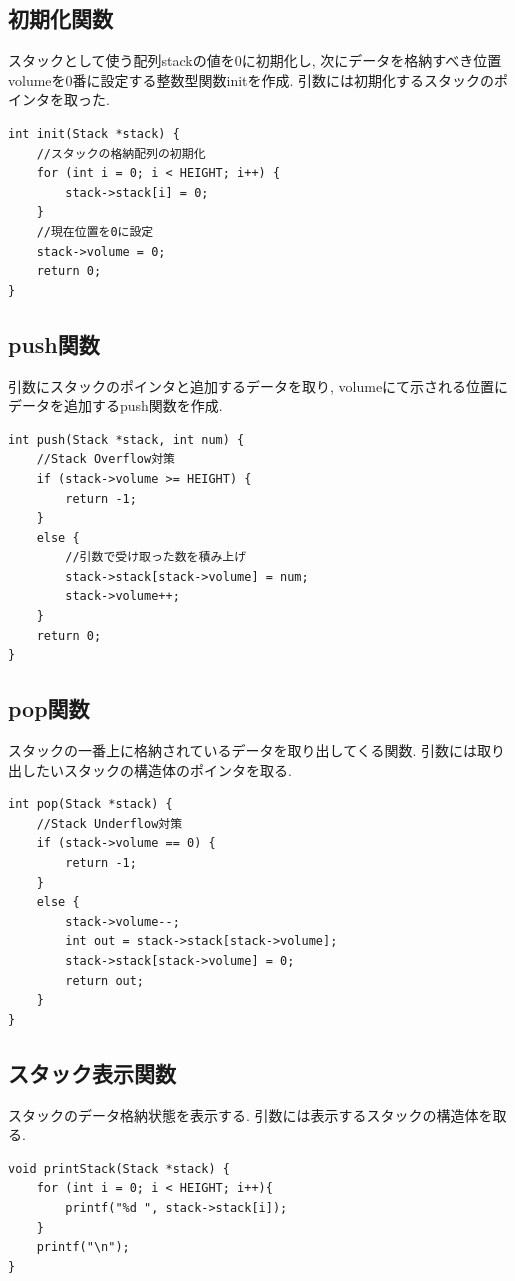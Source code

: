 \documentclass[a4j]{jsarticle}
\begin{document}
    \subsection{初期化関数}
    スタックとして使う配列stackの値を0に初期化し, 次にデータを格納すべき位置volumeを0番に設定する整数型関数initを作成. 
    引数には初期化するスタックのポインタを取った. 
    \begin{lstlisting}[label = init, caption = 初期化関数init]
int init(Stack *stack) {
	//スタックの格納配列の初期化
	for (int i = 0; i < HEIGHT; i++) {
		stack->stack[i] = 0;
	}
	//現在位置を0に設定
	stack->volume = 0;
	return 0;
}
    \end{lstlisting}

    \subsection{push関数}
    引数にスタックのポインタと追加するデータを取り, volumeにて示される位置にデータを追加するpush関数を作成. 
    \begin{lstlisting}[label = push, caption = push関数]
int push(Stack *stack, int num) {
	//Stack Overflow対策
	if (stack->volume >= HEIGHT) {
		return -1;
	}
	else {
		//引数で受け取った数を積み上げ
		stack->stack[stack->volume] = num;
		stack->volume++;
	}
	return 0;
}
    \end{lstlisting}
    \subsection{pop関数}
    スタックの一番上に格納されているデータを取り出してくる関数. 引数には取り出したいスタックの構造体のポインタを取る. 
    \begin{lstlisting}[label = pop, caption = pop関数]
int pop(Stack *stack) {
	//Stack Underflow対策
	if (stack->volume == 0) {
		return -1;
	}
	else {
		stack->volume--;
		int out = stack->stack[stack->volume];
		stack->stack[stack->volume] = 0;
		return out;
	}
}
    \end{lstlisting}
    \subsection{スタック表示関数}
    スタックのデータ格納状態を表示する. 引数には表示するスタックの構造体を取る. 　
    \begin{lstlisting}[label = printstack, caption = スタック表示関数]
void printStack(Stack *stack) {
	for (int i = 0; i < HEIGHT; i++){
		printf("%d ", stack->stack[i]);
	}
	printf("\n");
}
    \end{lstlisting}
    
\end{document}
